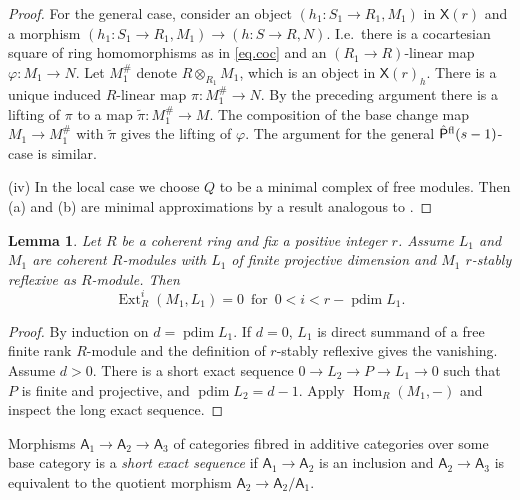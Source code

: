 \documentclass[a4paper,10pt]{amsart}
\theoremstyle{plain}
\newtheorem{lem}[xx]{Lemma}%
\theoremstyle{definition}
\theoremstyle{remark}
\numberwithin{equation}{xx}
\DeclareMathOperator{\Ext}{Ext}
\DeclareMathOperator{\Hom}{Hom}
\DeclareMathOperator{\pdim}{pdim}
\newcommand{\co}{\colon}
\newcommand{\ra}{\rightarrow}
\newcommand{\ot}{{\otimes}}
\newcommand{\Pf}{\hat{\cat{P}}{}^{\textnormal{fl}}}
\renewcommand{\phi}{\varphi}
\newcommand{\cat}[1]{\mathsf{{#1}}}
\newcommand{\hm}[4]{{\Hom}_{#2}^{#1}({#3},{#4})}
\newcommand{\xt}[4]{{\Ext} _{#2}^{#1}({#3},{#4})}
\begin{document}
\begin{proof}
For the general case, consider an object \((h_{1}\co S_{1}\ra R_{1},M_{1})\) in \(\cat{X}(r)\) and a morphism \((h_{1}\co S_{1}\ra R_{1},M_{1})\ra (h\co S\ra R,N)\). I.e.\ there is a cocartesian square of ring homomorphisms as in \eqref{eq.coc} and an \((R_{1}\ra R)\)-linear map \(\phi\co M_{1}\ra N\). Let \(M^{\#}_{1}\) denote \(R\ot_{R_{1}}M_{1}\), which is an object in \(\cat{X}(r)_{h}\). There is a unique induced \(R\)-linear map \(\pi\co M_{1}^{\#}\ra N\). By the preceding argument there is a lifting of \(\pi\) to a map \(\tilde{\pi}\co M_{1}^{\#}\ra M\). The composition of the base change map \(M_{1}\ra M_{1}^{\#}\) with \(\tilde{\pi}\) gives the lifting of \(\phi\). The argument for the general \(\Pf(s-1)\)-case is similar.

(iv) In the local case we choose \(Q\) to be a minimal complex of free modules. Then (a) and (b) are minimal approximations by a result analogous to \cite[6.2]{ile:12a}.
\end{proof}
\begin{lem}\label{lem.approx1}
Let \(R\) be a coherent ring and fix a positive integer \(r\). Assume \(L_{1}\) and \(M_{1}\) are coherent \(R\)-modules with \(L_{1}\) of finite projective dimension and \(M_{1}\) \(r\)-stably reflexive as \(R\)-module. Then
\begin{equation*}
\xt{i}{R}{M_{1}}{L_{1}}=0\, \text{ for }\, 0<i<r-\pdim L_{1}.  
\end{equation*}
\end{lem}
\begin{proof}
By induction on \(d=\pdim L_{1}\). If \(d=0\), \(L_{1}\) is direct summand of a free finite rank \(R\)-module and the definition of \(r\)-stably reflexive gives the vanishing. Assume \(d>0\). There is a short exact sequence \(0\ra L_{2}\ra P\ra L_{1}\ra 0\) such that \(P\) is finite and projective, and \(\pdim L_{2}=d-1\). Apply \(\hm{}{R}{M_{1}}{-}\) and inspect the long exact sequence.
\end{proof}
Morphisms \(\cat{A}_{1}\ra\cat{A}_{2}\ra\cat{A}_{3}\) of categories fibred in additive categories over some base category is a \emph{short exact sequence} if \(\cat{A}_{1}\ra\cat{A}_{2}\) is an inclusion and \(\cat{A}_{2}\ra \cat{A}_{3}\) is equivalent to the quotient morphism \(\cat{A}_{2}\ra\cat{A}_{2}/\cat{A}_{1}\).
\end{document}
